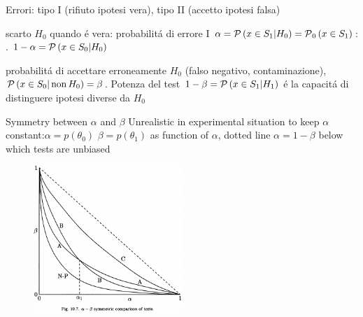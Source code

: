 \documentclass[asd-beamer.tex]{subfiles}
\begin{document}
\begin{frame}{Errori: tipo I (rifiuto ipotesi vera), tipo II (accetto ipotesi falsa)}
\begin{block}{ }
	scarto $H_0$ quando \'e vera: probabilit\'a di errore I $\alpha=\operatorname{\mathcal{P}}{(x\in S_1|H_0)}=\operatorname{\mathcal{P}}_0{(x\in S_1)}$: .  $1-\alpha=\operatorname{\mathcal{P}}{(x\in S_0|H_0)}$
\end{block}
\begin{block}{}
	probabilit\'a di accettare erroneamente $H_0$ (falso negativo, contaminazione), $\operatorname{\mathcal{P}}{(x\in S_0|\operatorname{non}{H_0})}=\beta$. Potenza del test $1-\beta=\operatorname{\mathcal{P}}{(x\in S_1|H_1)}$ \'e la capacit\'a di distinguere ipotesi diverse da $H_0$ 
\end{block}
\end{frame}

\begin{frame}{Symmetry between $\alpha$ and $\beta$}
Unrealistic in experimental situation to keep $\alpha$ constant:$\alpha=p(\theta_0)$ $\beta=p(\theta_1)$ as function of $\alpha$, dotted line $\alpha=1-\beta$ below which tests are unbiased
\begin{figure}[!ht]\includegraphics[trim={0cm 0cm 0 0},clip, keepaspectratio,width=0.5\textwidth]{figures/james/test/testabsym}\label{fig:testabsym}\end{figure}
\end{frame}
\end{document}
